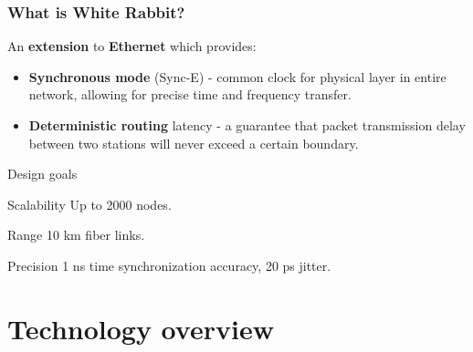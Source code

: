 \documentclass[compress,red]{beamer}
\begin{document}
\frame
{
  \frametitle{What is White Rabbit?}

\begin{block}{}
  An \textbf{extension} to \textbf{Ethernet} which provides:
  \begin{itemize}
  \item \textbf{Synchronous mode} (Sync-E) - common clock for physical layer in entire network, allowing for precise time and frequency transfer.

\item \textbf{Deterministic routing} latency - a guarantee that packet transmission delay between two stations will never exceed a certain boundary.
\end{itemize}
\end{block}

}

\begin{frame}{Design goals}
\begin{block}{Scalability}
Up to 2000 nodes.
\end{block}

\begin{block}{Range}
10 km fiber links.
\end{block}

\begin{block}{Precision}
1 ns time synchronization accuracy, 20 ps jitter.
\end{block}

\end{frame}

\section{Technology overview}

\end{document}
